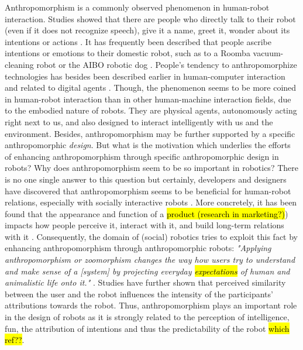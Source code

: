\documentclass{frontiersSCNS} %
\begin{document}
Anthropomorphism is a commonly observed phenomenon in human-robot interaction.
Studies showed that there are people who directly talk to their robot (even if
it does not recognize speech), give it a name, greet it, wonder about its
intentions or actions
\cite{eyssel_anthropomorphic_2010,fink_anthropomorphic_2012,forlizzi_how_2007,fussell_how_2008,kiesler_anthropomorphic_2008}.
It has frequently been described that people ascribe intentions or emotions to
their domestic robot, such as to a Roomba vacuum-cleaning robot
\cite{krumm_my_2007,sung_robots_2009} or the AIBO robotic dog
\cite{friedman_hardware_2003}. People's tendency to anthropomorphize
technologies has besides been described earlier in human-computer interaction
and related to digital agents \cite{reeves_media_1996,
nass_anthropocentrism_1995}. Though, the phenomenon seems to be more coined in
human-robot interaction than in other human-machine interaction fields, due to
the embodied nature of robots. They are physical agents, autonomously acting
right next to us, and also designed to interact intelligently with us and the
environment. Besides, anthropomorphism may be further supported by a specific
anthropomorphic \emph{design}. But what is the motivation which underlies the
efforts of enhancing anthropomorphism through specific anthropomorphic design in
robots? Why does anthropomorphism seem to be so important in robotics? There is
no one single answer to this question but certainly, developers and designers
have discovered that anthropomorphism seems to be beneficial for human-robot
relations, especially with socially interactive robots \cite{fong_survey_2003}.
More concretely, it has been found that the appearance and function of a
\hl{product (research in marketing?)}) impacts how people perceive it, interact
with it, and build long-term relations with it \cite{bartneck_shaping_2004}.
Consequently, the domain of (social) robotics tries to exploit this fact by
enhancing anthropomorphism through anthropomorphic robots: \textit{"Applying
anthropomorphism or zoomorphism changes the way how users try to understand and
make sense of a [system] by projecting everyday \hl{expectations} of human and
animalistic life onto it."} \cite{schmitz_concepts_2011}. Studies have further shown that perceived similarity between the
user and the robot influences the intensity of the participants' attributions
towards the robot. Thus, anthropomorphism plays an important role in the design
of robots as it is strongly related to the perception of intelligence, fun, the
attribution of intentions and thus the predictability of the robot \hl{which
ref??}.
\end{document}
